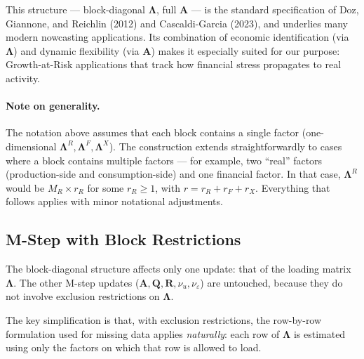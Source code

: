 \documentclass[11pt, a4paper, oneside]{article}
\newcommand{\mL}{\boldsymbol{\Lambda}}
\begin{document}
This structure — block-diagonal $\mL$, full $\mathbf{A}$ —
is the standard specification of Doz, Giannone, and Reichlin (2012)
and Cascaldi-Garcia (2023), and underlies many modern nowcasting
applications. Its combination of economic identification (via $\mL$)
and dynamic flexibility (via $\mathbf{A}$) makes it especially suited
for our purpose: Growth-at-Risk applications that track how financial
stress propagates to real activity.


\paragraph{Note on generality.}
The notation above assumes that each block contains a single factor
(one-dimensional $\mL^R, \mL^F, \mL^X$).
The construction extends straightforwardly to cases where a block
contains multiple factors — for example, two ``real'' factors
(production-side and consumption-side) and one financial factor.
In that case, $\mL^R$ would be $M_R \times r_R$ for some
$r_R \geq 1$, with $r = r_R + r_F + r_X$. Everything that follows
applies with minor notational adjustments.

\subsection{M-Step with Block Restrictions}
\label{subsec:block-mstep}

The block-diagonal structure affects only one update: that of the
loading matrix $\mL$. The other M-step updates
($\mathbf{A}, \mathbf{Q}, \mathbf{R}, \nu_u, \nu_\varepsilon$) are
untouched, because they do not involve exclusion restrictions on
$\mL$.

The key simplification is that, with exclusion restrictions, the
row-by-row formulation used for missing data applies
\emph{naturally}: each row of $\mL$ is estimated using
only the factors on which that row is allowed to load.
\end{document}
